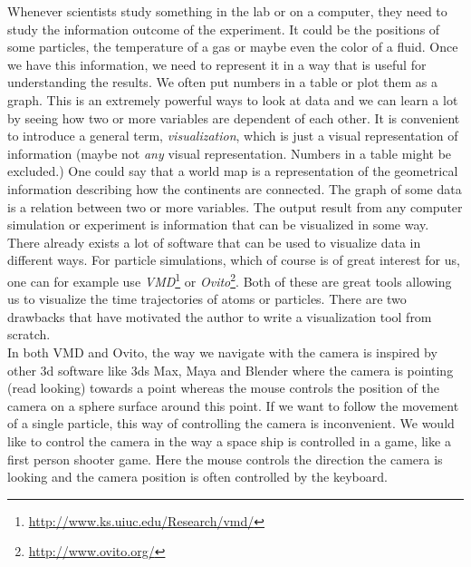 Whenever scientists study something in the lab or on a computer, they need to study the information outcome of the experiment. It could be the positions of some particles, the temperature of a gas or maybe even the color of a fluid. Once we have this information, we need to represent it in a way that is useful for understanding the results. We often put numbers in a table or plot them as a graph. This is an extremely powerful ways to look at data and we can learn a lot by seeing how two or more variables are dependent of each other. It is convenient to introduce a general term, \textit{visualization}, which is just a visual representation of information (maybe not \textit{any} visual representation. Numbers in a table might be excluded.) One could say that a world map is a representation of the geometrical information describing how the continents are connected. The graph of some data is a relation between two or more variables. The output result from any computer simulation or experiment is information that can be visualized in some way.\\
There already exists a lot of software that can be used to visualize data in different ways. For particle simulations, which of course is of great interest for us, one can for example use \textit{VMD}\footnote{\url{http://www.ks.uiuc.edu/Research/vmd/}} or \textit{Ovito}\footnote{\url{http://www.ovito.org/}}. Both of these are great tools allowing us to visualize the time trajectories of atoms or particles. There are two drawbacks that have motivated the author to write a visualization tool from scratch.\\
In both VMD and Ovito, the way we navigate with the camera is inspired by other 3d software like 3ds Max, Maya and Blender where the camera is pointing (read looking) towards a point whereas the mouse controls the position of the camera on a sphere surface around this point. If we want to follow the movement of a single particle, this way of controlling the camera is inconvenient. We would like to control the camera in the way a space ship is controlled in a game, like a first person shooter game. Here the mouse controls the direction the camera is looking and the camera position is often controlled by the keyboard.\\
